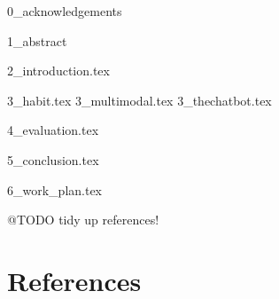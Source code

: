 \documentclass{article}
\begin{document}

    \maketitle
    \newpage

    {0_acknowledgements}
    \newpage

    {1_abstract}

    \tableofcontents
    \newpage

     {
      \fancyhf{}
      \lhead[\rightmark]{\thepage}
      \rhead[\thepage]{\leftmark}
      \setlength{\parindent}{0pt}
      \setlength{\parskip}{2ex}
    }


    {2_introduction.tex}

    {3_habit.tex}
    {3_multimodal.tex}
    {3_thechatbot.tex}

    {4_evaluation.tex}

    {5_conclusion.tex}

    {6_work_plan.tex}

    \cleardoublepage
    
    \renewcommand*{\refname}{}

    @TODO tidy up references!
    \section{References}
    


\end{document}
